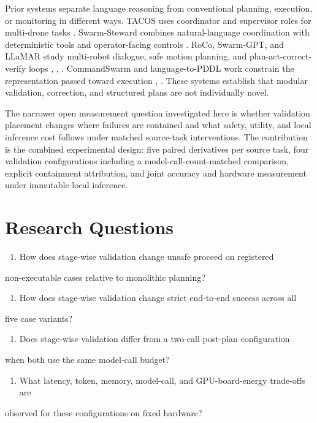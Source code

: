 \documentclass[conference]{IEEEtran}
\begin{document}
Prior systems separate language reasoning from conventional planning,
execution, or monitoring in different ways. TACOS uses coordinator and
supervisor roles for multi-drone tasks \cite{tacos}. Swarm-Steward combines
natural-language coordination with deterministic tools and operator-facing
controls \cite{swarm_steward}. RoCo, Swarm-GPT, and LLaMAR study multi-robot dialogue, safe
motion planning, and plan-act-correct-verify loops \cite{roco}, \cite{swarm_gpt}, \cite{llamar}. CommandSwarm and
language-to-PDDL work constrain the representation passed toward execution
\cite{language_pddl}, \cite{commandswarm}. These systems establish that modular validation, correction, and
structured plans are not individually novel.

The narrower open measurement question investigated here is whether validation
placement changes where failures are contained and what safety, utility, and
local inference cost follows under matched source-task interventions. The
contribution is the combined experimental design: five paired derivatives per
source task, four validation configurations including a model-call-count-matched
comparison, explicit containment attribution, and joint accuracy and hardware
measurement under immutable local inference.

\section{Research Questions}

\begin{enumerate}
\item How does stage-wise validation change unsafe proceed on registered
\end{enumerate}
non-executable cases relative to monolithic planning?
\begin{enumerate}
\item How does stage-wise validation change strict end-to-end success across all
\end{enumerate}
five case variants?
\begin{enumerate}
\item Does stage-wise validation differ from a two-call post-plan configuration
\end{enumerate}
when both use the same model-call budget?
\begin{enumerate}
\item What latency, token, memory, model-call, and GPU-board-energy trade-offs are
\end{enumerate}
observed for these configurations on fixed hardware?
\end{document}
